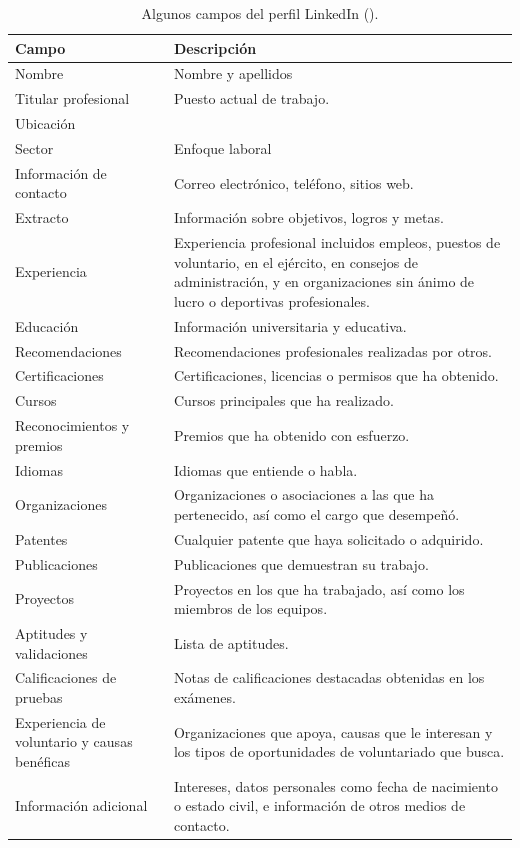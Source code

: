 \begin{table}[H] %
\centering
\begin{tabular}{|p{5cm} p{9cm}|}
\hline
\textbf{Campo} & \textbf{Descripción} \\
\hline \hline
Nombre & Nombre y apellidos\\ 
\hline
Titular profesional & Puesto actual de trabajo.\\
\hline
Ubicación & \\
\hline
Sector & Enfoque laboral\\
\hline
Información de contacto & {Correo electrónico, teléfono, sitios web.}\\
\hline
Extracto & Información sobre objetivos, logros y metas.\\
\hline
Experiencia & Experiencia profesional incluidos empleos, puestos de voluntario, en el ejército, en consejos de administración, y en organizaciones sin ánimo de lucro o deportivas profesionales.\\
\hline
Educación & Información universitaria y educativa.\\
\hline
Recomendaciones & Recomendaciones profesionales realizadas por otros. \\
\hline
Certificaciones & Certificaciones, licencias o permisos que ha obtenido.\\
\hline
Cursos & Cursos principales que ha realizado.\\
\hline
Reconocimientos y premios & Premios que ha obtenido con esfuerzo.\\
\hline
Idiomas & Idiomas que entiende o habla.\\
\hline
Organizaciones & Organizaciones o asociaciones a las que ha pertenecido, así como el cargo que desempeñó.\\
\hline
Patentes & Cualquier patente que haya solicitado o adquirido.\\
\hline
Publicaciones & Publicaciones que demuestran su trabajo.\\
\hline
Proyectos & Proyectos en los que ha trabajado, así como los miembros de los equipos.\\
\hline
Aptitudes y validaciones & Lista de aptitudes.\\
\hline
Calificaciones de pruebas & Notas de calificaciones destacadas obtenidas en los exámenes.\\
\hline
Experiencia de voluntario y causas benéficas &  Organizaciones que apoya, causas que le interesan y los tipos de oportunidades de voluntariado que busca.\\
\hline
Información adicional & Intereses, datos personales como fecha de nacimiento o estado civil, e información de otros medios de contacto.\\
\hline
\end{tabular}
\caption[Campos administrados en LinkedIn]{Algunos campos del perfil LinkedIn (\citeyear{fields_link}).}
\label{tabla:Campos LinkedIn}
\end{table}

